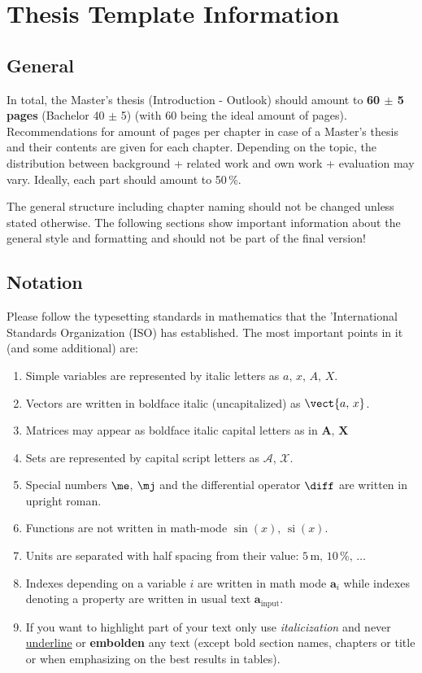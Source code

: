 \setcounter{chapter}{-1}
\chapter{Thesis Template Information}
\label{ch:template_info}
\section{General}
\label{sec:general}
In total, the Master's thesis (Introduction - Outlook) should amount to \textbf{60 $\pm$ 5 pages} (Bachelor 40 $\pm$ 5) (with 60 being the ideal amount of pages). Recommendations for amount of pages per chapter in case of a Master's thesis and their contents are given for each chapter. Depending on the topic, the distribution between background + related work and own work + evaluation may vary. Ideally, each part should amount to 50\,\%.

The general structure including chapter naming should not be changed unless stated otherwise. The following sections show important information about the general style and formatting and should not be part of the final version!

\section{Notation}
\label{sec:notation}
Please follow the typesetting standards in mathematics that the 'International Standards Organization (ISO) has established. The most important points in it (and some additional) are: 
  

\begin{enumerate}
\item Simple variables are represented by italic letters as $a,\,x,\,A,\,X$.
\item Vectors are written in boldface italic (uncapitalized) as $\vect{a,\, x}$.
\item Matrices may appear as boldface italic capital letters as in $\boldsymbol{A,\, X}$
\item Sets are represented by capital script letters as $\mathcal{A}$, $\mathcal{X}$.
\item Special numbers $\me$, $\mj$ and the differential operator $\diff$ are written in upright roman.
\item Functions are not written in math-mode $\sin(x),\,\operatorname{si}(x)$.
\item Units are separated with half spacing from their value: $5\,\text{m},\,10\,\%,\,\ldots$ 

\item Indexes depending on a variable $i$ are written in math mode $\boldsymbol{a}_i$ while indexes denoting a property are written in usual text $\boldsymbol{a}_{\text{input}}$.

\item If you want to highlight part of your text only use \textit{italicization} and never \underline{underline} or \textbf{embolden} any text (except bold section names, chapters or title or when emphasizing on the best results in tables).

\end{enumerate}

